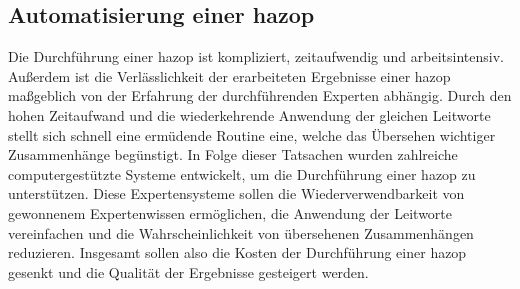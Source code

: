 \subsection{Automatisierung einer \ac{hazop}}
Die Durchf\"uhrung einer \ac{hazop} ist kompliziert, zeitaufwendig und arbeitsintensiv. Au\ss{}erdem ist die Verl\"asslichkeit der erarbeiteten Ergebnisse einer \ac{hazop} ma\ss{}geblich von der Erfahrung der durchf\"uhrenden Experten abh\"angig. Durch den hohen Zeitaufwand und die wiederkehrende Anwendung der gleichen Leitworte stellt sich schnell eine erm\"udende Routine eine, welche das \"Ubersehen wichtiger Zusammenh\"ange beg\"unstigt. In Folge dieser Tatsachen wurden zahlreiche computergest\"utzte Systeme entwickelt, um die Durchf\"uhrung einer \ac{hazop} zu unterst\"utzen. Diese Expertensysteme sollen die Wiederverwendbarkeit von gewonnenem Expertenwissen erm\"oglichen, die Anwendung der Leitworte vereinfachen und die Wahrscheinlichkeit von \"ubersehenen Zusammenh\"angen reduzieren. Insgesamt sollen also die Kosten der Durchf\"uhrung einer \ac{hazop} gesenkt und die Qualit\"at der Ergebnisse gesteigert werden. 

